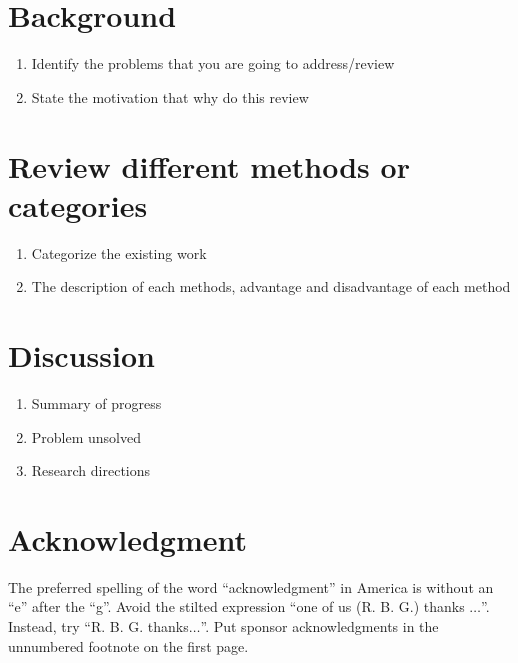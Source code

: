 \documentclass[conference]{IEEEtran}
\begin{document}
\section{Background}
\begin{enumerate}
	\item Identify the problems that you are going to address/review
	\item State the motivation that why do this review
\end{enumerate}
\section{Review different methods or categories}
\begin{enumerate}
	\item Categorize the existing work
	\item The description of each methods, advantage and disadvantage of each method
\end{enumerate}
\section{Discussion}
\begin{enumerate}
	\item Summary of progress
	\item Problem unsolved 
	\item Research directions
\end{enumerate}


\section*{Acknowledgment}

The preferred spelling of the word ``acknowledgment'' in America is without 
an ``e'' after the ``g''. Avoid the stilted expression ``one of us (R. B. 
G.) thanks $\ldots$''. Instead, try ``R. B. G. thanks$\ldots$''. Put sponsor 
acknowledgments in the unnumbered footnote on the first page.



 
\end{document}
